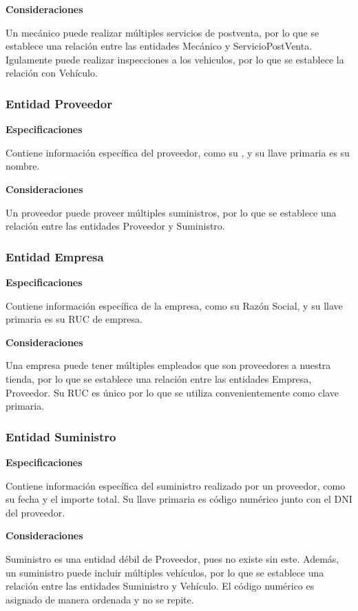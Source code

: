 \documentclass[12pt]{article}
\begin{document}
\textbf{Consideraciones}

Un mecánico puede realizar múltiples servicios de postventa, por lo que se establece una relación entre las entidades Mecánico y ServicioPostVenta. Igulamente puede realizar inspecciones a los vehiculos, por lo que se establece la relación con Vehículo.

\subsubsection{Entidad Proveedor}
\textbf{Especificaciones}

Contiene información específica del proveedor, como su , y su llave primaria es su nombre.

\textbf{Consideraciones}

Un proveedor puede proveer múltiples suministros, por lo que se establece una relación entre las entidades Proveedor y Suministro.

\subsubsection{Entidad Empresa}
\textbf{Especificaciones}

Contiene información específica de la empresa, como su Razón Social, y su llave primaria es su RUC de empresa.

\textbf{Consideraciones}

Una empresa puede tener múltiples empleados que son proveedores a nuestra tienda, por lo que se establece una relación entre las entidades Empresa, Proveedor. Su RUC es único por lo que se utiliza convenientemente como clave primaria.

\subsubsection{Entidad Suministro}
\textbf{Especificaciones}

Contiene información específica del suministro realizado por un proveedor, como su fecha y el importe total. Su llave primaria es código numérico junto con el DNI del proveedor.

\textbf{Consideraciones}

Suministro es una entidad débil de Proveedor, pues no existe sin este. Además, un suministro puede incluir múltiples vehículos, por lo que se establece una relación entre las entidades Suministro y Vehículo. El código numérico es asignado de manera ordenada y no se repite.
\end{document}
